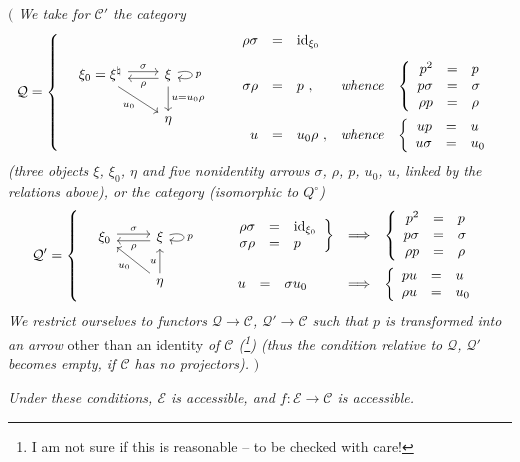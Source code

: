 \documentclass[11pt]{article}
\begin{document}
$\Big($ \textit{We take for $\mathcal{C}'$ the category}
\[
\mathcal{Q} = \left\{ \quad
\begin{tikzcd}[column sep=2.2em]
\xi_0 = \xi^\natural \arrow[r, shift left, "\sigma"] \arrow[dr, "u_0"'] & \xi \arrow[l, shift left, "\rho"] \arrow[d, "u = u_0\rho"] \arrow[loop right, "p"] \\
 & \eta
\end{tikzcd}
\qquad
\begin{array}{rclll}
\rho\sigma & = & \mathrm{id}_{\xi_0} & & \\[2ex]
\sigma\rho & = & p\ , & \text{\textit{whence}} & \left\{\begin{array}{rcl} p^2 & = & p \\ p\sigma & = & \sigma \\ \rho p & = & \rho \end{array}\right. \\[4ex]
u & = & u_0\rho\ , & \text{\textit{whence}} & \left\{\begin{array}{rcl} up & = & u \\ u\sigma & = & u_0 \end{array}\right.
\end{array}
\right.
\]
\textit{(three objects $\xi$, $\xi_0$, $\eta$ and five nonidentity arrows $\sigma$, $\rho$, $p$, $u_0$, $u$, linked by the relations above), or the category (isomorphic to $Q^\circ$)} %
\[
\mathcal{Q}' = \left\{ \quad
\begin{tikzcd}
\xi_0 \arrow[r, shift left, "\sigma"] & \xi \arrow[l, shift left, "\rho"] \arrow[loop right, "p"] \\
 & \eta \arrow[ul, "u_0"] \arrow[u, "u"]
\end{tikzcd}
\qquad
\begin{array}{lcl}
\left.\begin{array}{rcl} \rho\sigma & = & \mathrm{id}_{\xi_0} \\ \sigma\rho & = & p \end{array}\right\} & \Longrightarrow & \left\{\begin{array}{rcl} p^2 & = & p \\ p\sigma & = & \sigma \\ \rho p & = & \rho \end{array}\right. \\[4ex]
\begin{array}{rcl} u & = & \sigma u_0 \end{array} & \Longrightarrow & \left\{\begin{array}{rcl} pu & = & u \\ \rho u & = & u_0 \end{array}\right.
\end{array}
\right.
\]
\textit{We restrict ourselves to functors $\mathcal{Q} \longrightarrow \mathcal{C}$, $\mathcal{Q}' \longrightarrow \mathcal{C}$ such that $p$ is transformed into an arrow} other than an identity \textit{of $\mathcal{C}$ (\footnote[195]{I am not sure if this is reasonable -- to be checked with care!}) (thus the condition relative to $\mathcal{Q}$, $\mathcal{Q}'$ becomes empty, if $\mathcal{C}$ has no projectors).} $\Big)$

\textit{Under these conditions, $\mathcal{E}$ is accessible, and $f : \mathcal{E} \longrightarrow \mathcal{C}$ is accessible.}
\end{document}
